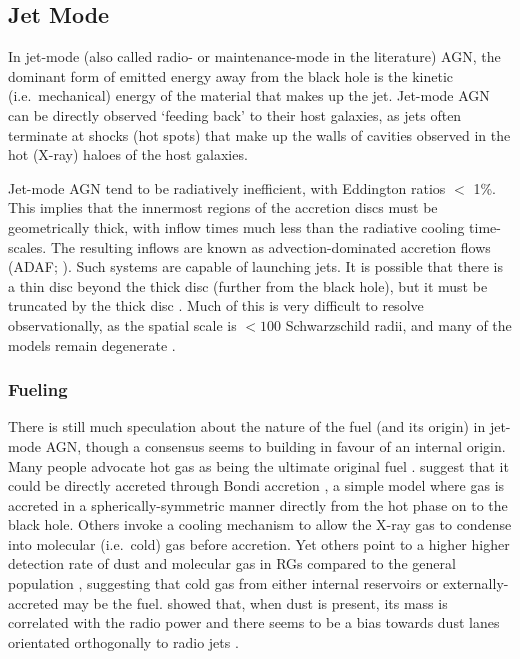 	\subsection{Jet Mode}
		\label{subsec:Jet}
		In jet-mode (also called radio- or maintenance-mode in the literature) AGN, the dominant form of emitted energy away from the black hole is the kinetic (i.e.\ mechanical) energy of the material that makes up the jet. Jet-mode AGN can be directly observed `feeding back' to their host galaxies, as jets often terminate at shocks (hot spots) that make up the walls of cavities observed in the hot (X-ray) haloes of the host galaxies.

		Jet-mode AGN tend to be radiatively inefficient, with Eddington ratios $<$ 1\%. This implies that the innermost regions of the accretion discs must be geometrically thick, with inflow times much less than the radiative cooling time-scales. The resulting inflows are known as advection-dominated accretion flows (ADAF; \citealt{Narayan1994}). Such systems are capable of launching jets. It is possible that there is a thin disc beyond the thick disc (further from the black hole), but it must be truncated by the thick disc \cite[e.g.][]{Abramowicz2002, Sadler2014}. Much of this is very difficult to resolve observationally, as the spatial scale is $< 100$ Schwarzschild radii, and many of the models remain degenerate \citep[e.g.][]{Quataert1999}. 

		\subsubsection{Fueling}
			\label{subsubsec:JetFueling}
			There is still much speculation about the nature of the fuel (and its origin) in jet-mode AGN, though a consensus seems to building in favour of an internal origin. Many people advocate hot gas as being the ultimate original fuel \citep[e.g.][]{Allen2006}. \citet{Hardcastle2007} suggest that it could be directly accreted through Bondi accretion \citep{Bondi1952}, a simple model where gas is accreted in a spherically-symmetric manner directly from the hot phase on to the black hole. Others invoke a cooling mechanism to allow the X-ray gas to condense into molecular (i.e.\ cold) gas before accretion. Yet others point to a higher higher detection rate of dust and molecular gas in RGs compared to the general population \citep[e.g.][]{Lim2000, DeRuiter2002, Leon2003, VerdoesKleijn2005}, suggesting that cold gas from either internal reservoirs or externally-accreted may be the fuel. \citet{DeRuiter2002} showed that, when dust is present, its mass is correlated with the radio power and there seems to be a bias towards dust lanes orientated orthogonally to radio jets \citep{VerdoesKleijn2005}.

